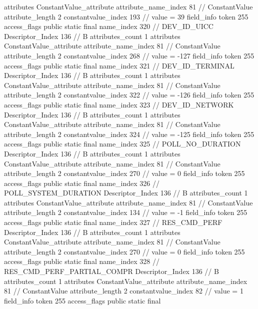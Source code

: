 {{{{{				attributes {
				ConstantValue_attribute {
					attribute_name_index	81		// ConstantValue
					attribute_length	2
					constantvalue_index	193		// value = 39
				}
				}
			}
			field_info {
				token	255
				access_flags	public static final
				name_index	320		// DEV_ID_UICC
				Descriptor_Index	136		// B
				attributes_count	1
				attributes {
				ConstantValue_attribute {
					attribute_name_index	81		// ConstantValue
					attribute_length	2
					constantvalue_index	268		// value = -127
				}
				}
			}
			field_info {
				token	255
				access_flags	public static final
				name_index	321		// DEV_ID_TERMINAL
				Descriptor_Index	136		// B
				attributes_count	1
				attributes {
				ConstantValue_attribute {
					attribute_name_index	81		// ConstantValue
					attribute_length	2
					constantvalue_index	322		// value = -126
				}
				}
			}
			field_info {
				token	255
				access_flags	public static final
				name_index	323		// DEV_ID_NETWORK
				Descriptor_Index	136		// B
				attributes_count	1
				attributes {
				ConstantValue_attribute {
					attribute_name_index	81		// ConstantValue
					attribute_length	2
					constantvalue_index	324		// value = -125
				}
				}
			}
			field_info {
				token	255
				access_flags	public static final
				name_index	325		// POLL_NO_DURATION
				Descriptor_Index	136		// B
				attributes_count	1
				attributes {
				ConstantValue_attribute {
					attribute_name_index	81		// ConstantValue
					attribute_length	2
					constantvalue_index	270		// value = 0
				}
				}
			}
			field_info {
				token	255
				access_flags	public static final
				name_index	326		// POLL_SYSTEM_DURATION
				Descriptor_Index	136		// B
				attributes_count	1
				attributes {
				ConstantValue_attribute {
					attribute_name_index	81		// ConstantValue
					attribute_length	2
					constantvalue_index	134		// value = -1
				}
				}
			}
			field_info {
				token	255
				access_flags	public static final
				name_index	327		// RES_CMD_PERF
				Descriptor_Index	136		// B
				attributes_count	1
				attributes {
				ConstantValue_attribute {
					attribute_name_index	81		// ConstantValue
					attribute_length	2
					constantvalue_index	270		// value = 0
				}
				}
			}
			field_info {
				token	255
				access_flags	public static final
				name_index	328		// RES_CMD_PERF_PARTIAL_COMPR
				Descriptor_Index	136		// B
				attributes_count	1
				attributes {
				ConstantValue_attribute {
					attribute_name_index	81		// ConstantValue
					attribute_length	2
					constantvalue_index	82		// value = 1
				}
				}
			}
			field_info {
				token	255
				access_flags	public static final
}}}}}
